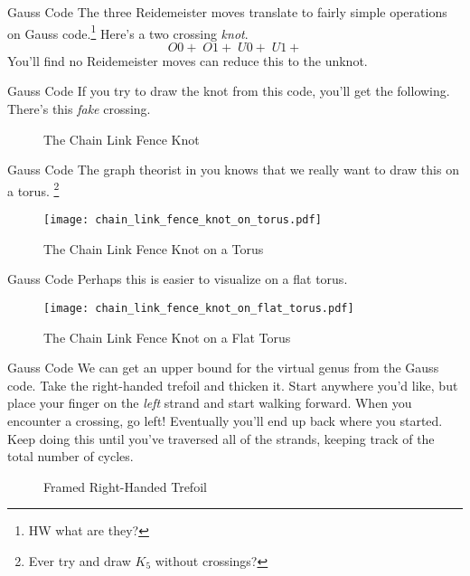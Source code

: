 \documentclass{beamer}
\begin{document}
    \begin{frame}{Gauss Code}
        The three Reidemeister moves translate to fairly simple operations on
        Gauss code.\footnote{HW what are they?}
        Here's a two crossing \textit{knot}.
        \begin{equation}
            O0+\;O1+\;U0+\;U1+
        \end{equation}
        You'll find no Reidemeister moves can reduce this to the unknot.
    \end{frame}
    \begin{frame}{Gauss Code}
        If you try to draw the knot from this code, you'll get the following.
        There's this \textit{fake} crossing.
        \begin{figure}
            \centering
            \caption{The Chain Link Fence Knot}
            \label{fig:chain_link_fence_knot}
        \end{figure}
    \end{frame}
    \begin{frame}{Gauss Code}
        The graph theorist in you knows that we really want to draw this on a
        torus.%
        \footnote{Ever try and draw $K_{5}$ without crossings?}
        \begin{figure}
            \centering
            \texttt{[image: chain\_link\_fence\_knot\_on\_torus.pdf]}
            \caption{The Chain Link Fence Knot on a Torus}
            \label{fig:chain_link_fence_knot_on_torus}
        \end{figure}
    \end{frame}
    \begin{frame}{Gauss Code}
        Perhaps this is easier to visualize on a flat torus.
        \begin{figure}
            \centering
            \texttt{[image: chain\_link\_fence\_knot\_on\_flat\_torus.pdf]}
            \caption{The Chain Link Fence Knot on a Flat Torus}
            \label{fig:chain_link_fence_knot_on_flat_torus}
        \end{figure}
    \end{frame}
    \begin{frame}{Gauss Code}
        We can get an upper bound for the virtual genus from the Gauss code.
        Take the right-handed trefoil and thicken it.
        Start anywhere you'd like, but
        place your finger on the \textit{left} strand and start walking forward.
        When you encounter a crossing, go left! Eventually you'll end up back
        where you started. Keep doing this until you've traversed all of the
        strands, keeping track of the total number of cycles.
        \begin{figure}
            \centering
            \caption{Framed Right-Handed Trefoil}
            \label{fig:trefoil_knot_framed_001}
        \end{figure}
    \end{frame}
\end{document}
